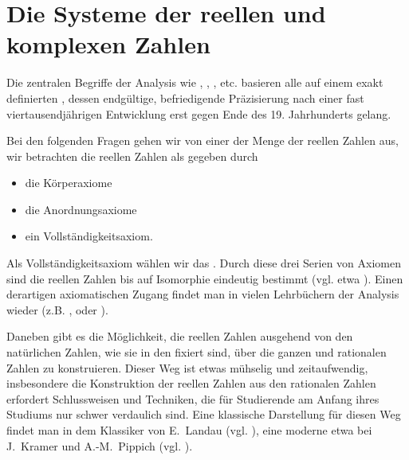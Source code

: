 

\chapter{Die Systeme der reellen und komplexen Zahlen}  

Die zentralen Begriffe der Analysis wie , 
, , 
 etc. basieren alle auf einem exakt 
definierten , dessen endgültige, befriedigende 
Präzisierung nach einer fast viertausendjährigen Entwicklung 
erst gegen Ende des 19. Jahrhunderts gelang. 

Bei den folgenden Fragen gehen wir
von einer  der Menge der 
reellen Zahlen aus, {\dasheisst} wir betrachten die reellen Zahlen als 
gegeben durch
\begin{itemize}[2mm]
\item[\desc{i}] die Körperaxiome 
\item[\desc{ii}] die Anordnungsaxiome
\item[\desc{iii}] ein Vollständigkeitsaxiom.
\end{itemize}
Als Vollständigkeitsaxiom
wählen wir das . 
Durch diese drei Serien von Axiomen sind die reellen Zahlen bis auf 
Isomorphie eindeutig bestimmt (vgl. etwa \citep{Ebbinghaus}). 
Einen derartigen axiomatischen Zugang findet man in 
vielen Lehrbüchern der Analysis 
wieder (z.B. \citep{Barner}, \citep{Forster} oder \citep{Koenig}). 

Daneben gibt es die Möglichkeit, die reellen Zahlen ausgehend 
von den natürlichen Zahlen, wie sie in den 
fixiert sind, über die ganzen und rationalen Zahlen zu konstruieren. 
Dieser Weg ist etwas mühselig und zeitaufwendig, 
insbesondere die Konstruktion der reellen 
Zahlen aus den rationalen Zahlen erfordert Schlussweisen und Techniken, die 
für Studierende am Anfang ihres Studiums nur schwer verdaulich sind. 
Eine klassische Darstellung für diesen Weg findet man in dem Klassiker 
von E.~Landau (vgl. \citep{Landau}), eine moderne etwa bei J.~Kramer und 
A.-M.~Pippich (vgl. \citep{Kramer}).

